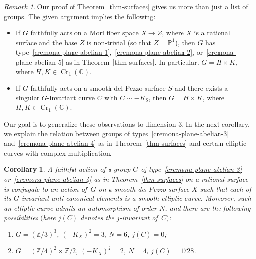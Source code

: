 \documentclass[11pt]{amsart}
\numberwithin{equation}{section}
\newtheorem{corollary}[thm]{Corollary}
\theoremstyle{definition}
\theoremstyle{remark}
\newtheorem{remark}[thm]{Remark}
\DeclareMathOperator{\Cr}{Cr}
\begin{document}
\begin{remark} 
Our proof of Theorem~\ref{thm-surfaces} gives us more than just a list of groups. The given argument implies the following: 
\begin{itemize}
\item
If $G$ faithfully acts on a Mori fiber space $X\to Z$, where $X$ is a rational surface and the base $Z$ is non-trivial (so that $Z=\mathbb{P}^1$), then $G$ has type~\eqref{cremona-plane-abelian-1},~\eqref{cremona-plane-abelian-2}, or~\eqref{cremona-plane-abelian-5} as in Theorem~\ref{thm-surfaces}. In particular, $G=H\times K$, where $H, K\in \Cr_1(\mathbb{C})$.
\item
  If $G$ faithfully acts on a smooth del Pezzo surface $S$ and there exists a singular $G$-invariant curve $C$ with $C\sim -K_S$, then $G=H\times K$, where $H, K\in \Cr_1(\mathbb{C})$.
\end{itemize}
Our goal is to generalize these observations to dimension $3$. In the next corollary, we explain the relation between groups of types~\eqref{cremona-plane-abelian-3} and~\eqref{cremona-plane-abelian-4} as in Theorem~\ref{thm-surfaces} and certain elliptic curves with complex multiplication.
\end{remark}

\begin{corollary}
A faithful action of a group $G$ of type~\eqref{cremona-plane-abelian-3} or~\eqref{cremona-plane-abelian-4} as in Theorem~\ref{thm-surfaces} on a rational surface is conjugate to an action of\, $G$ on a smooth del Pezzo surface $X$ such that each of its $G$-invariant anti-canonical elements is a smooth elliptic curve. Moreover, such an elliptic curve admits an automorphism of order $N$, and there are the following possibilities $($here $j(C)$ denotes the $j$-invariant of\, $C)$:  
\begin{enumerate}\setlength{\itemsep}{2pt}
\item
$G=(\mathbb{Z}/3)^3$, $(-K_X)^2=3$, $N=6$, $j(C)=0$;  
\item
$G=(\mathbb{Z}/4)^2\times\mathbb{Z}/2$, $(-K_X)^2=2$, $N=4$,  $j(C)=1728$.
\end{enumerate}
\end{corollary}
\end{document}
